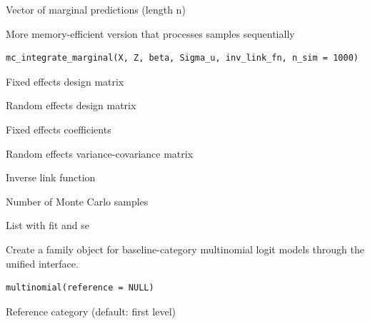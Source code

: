 \documentclass[a4paper]{book}
\begin{document}
%
\begin{Value}
Vector of marginal predictions (length n)
\end{Value}
%
\begin{Description}
More memory-efficient version that processes samples sequentially
\end{Description}
%
\begin{Usage}
\begin{verbatim}
mc_integrate_marginal(X, Z, beta, Sigma_u, inv_link_fn, n_sim = 1000)
\end{verbatim}
\end{Usage}
%
\begin{Arguments}
\begin{ldescription}
\item[\code{X}] Fixed effects design matrix

\item[\code{Z}] Random effects design matrix

\item[\code{beta}] Fixed effects coefficients

\item[\code{Sigma\_u}] Random effects variance-covariance matrix

\item[\code{inv\_link\_fn}] Inverse link function

\item[\code{n\_sim}] Number of Monte Carlo samples
\end{ldescription}
\end{Arguments}
%
\begin{Value}
List with fit and se
\end{Value}
%
\begin{Description}
Create a family object for baseline-category multinomial logit models
through the unified  interface.
\end{Description}
%
\begin{Usage}
\begin{verbatim}
multinomial(reference = NULL)
\end{verbatim}
\end{Usage}
%
\begin{Arguments}
\begin{ldescription}
\item[\code{reference}] Reference category (default: first level)
\end{ldescription}
\end{Arguments}
\end{document}
